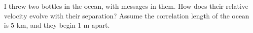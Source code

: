 
    I threw two bottles in the ocean, with messages in them.  
    How does their relative velocity evolve with their separation? Assume the
correlation length of the ocean is 5 km, and they begin 1 m apart.


 
